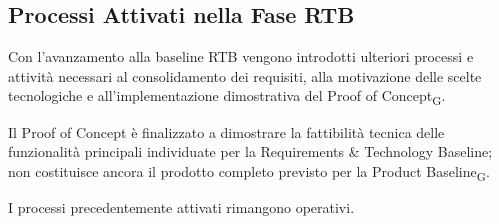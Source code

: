 
\subsection{Processi Attivati nella Fase RTB}

Con l'avanzamento alla baseline RTB vengono introdotti ulteriori processi e
attività necessari al consolidamento dei requisiti, alla motivazione delle scelte
tecnologiche e all'implementazione dimostrativa del Proof of Concept\textsubscript{G}.

Il Proof of Concept è finalizzato a dimostrare la fattibilità tecnica delle
funzionalità principali individuate per la Requirements \& Technology
Baseline; non costituisce ancora il prodotto completo previsto
per la Product Baseline\textsubscript{G}.

I processi precedentemente attivati rimangono operativi.

\bigskip

